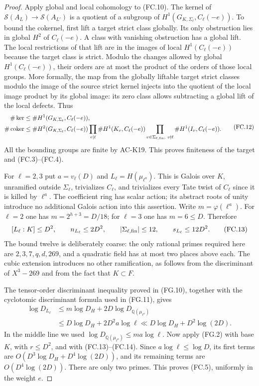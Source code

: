 \begin{proof}
Apply global and local cohomology to (FC.10).  The
kernel of $\mathcal S(A_L)\to\mathcal S(A_{L'})$ is
a quotient of a subgroup of $H^1(G_{K,\Sigma_\ell},C_\ell(-e))$.
To bound the cokernel, first lift a target strict class
globally.  Its only obstruction lies in global $H^2$
of $C_\ell(-e)$.  A class with vanishing obstruction
has a global lift.  The local restrictions of that lift
are in the images of local $H^1(C_\ell(-e))$ because
the target class is strict.  Modulo the changes allowed
by global $H^1(C_\ell(-e))$, their orders are at most
the product of the orders of those local groups.
More formally, the map from the globally liftable
target strict classes modulo the image of the source
strict kernel injects into the quotient of the local
image product by its global image: its zero class
allows subtracting a global lift of the local defects.
Thus
\[
 \begin{split}
 \#\ker&\leq\#H^1(G_{K,\Sigma_\ell},C_\ell(-e)),\\
 \#\operatorname{coker}&\leq
 \#H^2(G_{K,\Sigma_\ell},C_\ell(-e))
 \prod_{v\mid\ell}\#H^1(K_v,C_\ell(-e))
 \prod_{v\in\Sigma_{\ell,\rm fin},\ v\nmid\ell}
                                      \#H^1(I_v,C_\ell(-e)).
 \end{split}                                             \tag{FC.12}
\]
All the bounding groups are finite by AC-K19.
This proves finiteness of the target and (FC.3)--(FC.4).

For $\ell=2,3$ put $a=v_\ell(D)$ and
$L_\ell=H(\mu_{\ell^a})$.
This is Galois over $K$, unramified outside
$\Sigma_\ell$, trivializes $C_\ell$, and trivializes
every Tate twist of $C_\ell$ since it is killed by
$\ell^a$.  The coefficient ring has scalar action;
its abstract roots of unity introduce no additional
Galois action into this assertion.
Write $m=\varphi(\ell^a)$.
For $\ell=2$ one has $m=2^{h+3}=D/18$;
for $\ell=3$ one has $m=6\leq D$.
Therefore
\[
 [L_\ell:K]\leq D^2,\qquad n_{L_\ell}\leq2D^2,
 \qquad |\Sigma_{\ell,\rm fin}|\leq12,
 \qquad s_{L_\ell}\leq12D^2.                     \tag{FC.13}
\]
The bound twelve is deliberately coarse: the only
rational primes required here are $2,3,7,q,d,269$,
and a quadratic field has at most two places above each.
The cubic extension introduces no other ramification,
as follows from the discriminant of $X^3-269$ and
from the fact that $K\subset F$.

The tensor-order discriminant inequality proved in
(FG.10), together with the cyclotomic discriminant
formula used in (FG.11), gives
\[
 \begin{split}
 \log D_{L_\ell}
 &\leq m\log D_H+2D\log D_{\mathbb Q(\mu_{\ell^a})}\\
 &\leq D\log D_H+2D^2a\log\ell
 \ll D\log D_H+D^2\log(2D).
 \end{split}                                      \tag{FC.14}
\]
In the middle line we used
$\log D_{\mathbb Q(\mu_{\ell^a})}\leq ma\log\ell$.
Now apply (FG.2) with base $K$, with
$r\leq D^2$, and with (FC.13)--(FC.14).
Since $a\log\ell\leq\log D$, its first terms are
$O(D^3\log D_H+D^4\log(2D))$, and its remaining
terms are $O(D^4\log(2D))$.
There are only two primes.  This proves (FC.5),
uniformly in the weight $e$.


\end{proof}
